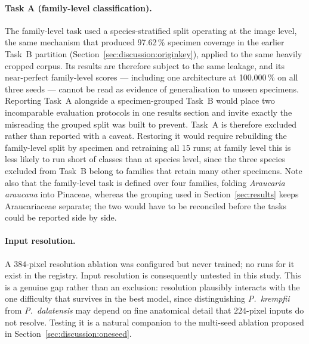 \paragraph{Task A (family-level classification).} The family-level task used
a species-stratified split operating at the image level, the same mechanism
that produced 97.62\,\% specimen coverage in the earlier Task~B partition
(Section~\ref{sec:discussion:originkey}), applied to the same heavily cropped
corpus. Its results are therefore subject to the same leakage, and its
near-perfect family-level scores --- including one architecture at
100.000\,\% on all three seeds --- cannot be read as evidence of
generalisation to unseen specimens. Reporting Task~A alongside a
specimen-grouped Task~B would place two incomparable evaluation protocols in
one results section and invite exactly the misreading the grouped split was
built to prevent. Task~A is therefore excluded rather than reported with a
caveat. Restoring it would require rebuilding the family-level split by
specimen and retraining all 15 runs; at family level this is less likely to
run short of classes than at species level, since the three species excluded
from Task~B belong to families that retain many other specimens. Note also
that the family-level task is defined over four families, folding
\textit{Araucaria araucana} into Pinaceae, whereas the grouping used in
Section~\ref{sec:results} keeps Araucariaceae separate; the two would have to
be reconciled before the tasks could be reported side by side.

\paragraph{Input resolution.} A $384$-pixel resolution ablation was
configured but never trained; no runs for it exist in the registry. Input
resolution is consequently untested in this study. This is a genuine gap
rather than an exclusion: resolution plausibly interacts with the one
difficulty that survives in the best model, since distinguishing
\textit{P.\ krempfii} from \textit{P.\ dalatensis} may depend on fine
anatomical detail that $224$-pixel inputs do not resolve. Testing it is a
natural companion to the multi-seed ablation proposed in
Section~\ref{sec:discussion:oneseed}.
